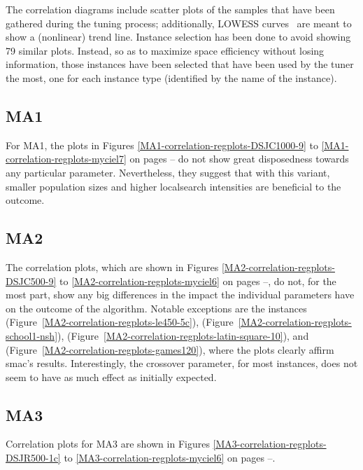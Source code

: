 \documentclass[thesis.tex]{subfiles}
\begin{document}
The correlation diagrams include scatter plots of the samples that have been gathered during the tuning process; additionally, \gls{LOWESS} curves~\parencite{lowess} are meant to show a (nonlinear) trend line. Instance selection has been done to avoid showing 79 similar plots. Instead, so as to maximize space efficiency without losing information, those instances have been selected that have been used by the tuner the most, one for each instance type (identified by the name of the instance).

\subsection{MA1}
For \gls{MA1}, the plots in Figures \ref{MA1-correlation-regplots-DSJC1000-9} to \ref{MA1-correlation-regplots-myciel7} on pages \pageref{MA1-correlation-regplots-DSJC1000-9}--\pageref{MA1-correlation-regplots-myciel7} do not show great disposedness towards any particular parameter. Nevertheless, they suggest that with this variant, smaller population sizes and higher localsearch intensities are beneficial to the outcome.


\clearpage
\subsection{MA2}
The correlation plots, which are shown in Figures \ref{MA2-correlation-regplots-DSJC500-9} to \ref{MA2-correlation-regplots-myciel6} on pages \pageref{MA2-correlation-regplots-DSJC500-9}--\pageref{MA2-correlation-regplots-myciel6}, do not, for the most part, show any big differences in the impact the individual parameters have on the outcome of the algorithm. Notable exceptions are the instances  (Figure~\ref{MA2-correlation-regplots-le450-5c}),  (Figure~\ref{MA2-correlation-regplots-school1-nsh}),  (Figure~\ref{MA2-correlation-regplots-latin-square-10}), and  (Figure~\ref{MA2-correlation-regplots-games120}), where the plots clearly affirm \gls{smac}'s results. Interestingly, the crossover parameter, for most instances, does not seem to have as much effect as initially expected.


\clearpage
\subsection{MA3}
Correlation plots for \gls{MA3} are shown in Figures \ref{MA3-correlation-regplots-DSJR500-1c} to \ref{MA3-correlation-regplots-myciel6} on pages \pageref{MA3-correlation-regplots-DSJR500-1c}--\pageref{MA3-correlation-regplots-myciel6}.
\end{document}
